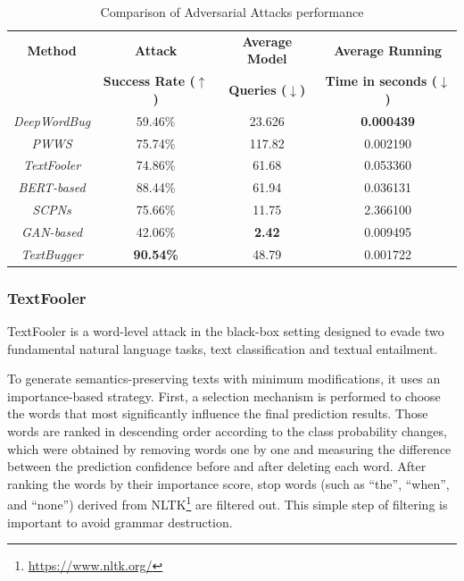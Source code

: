 \begin{table}[h]
  \footnotesize
  \centering
  \begin{tabular}{|c||c|c|c|}
    \hline
    \textbf{Method} & \textbf{Attack}  & \textbf{Average Model}  & \textbf{Average Running} \\
           & \textbf{Success Rate ($\bm{\uparrow}$)} & \textbf{Queries ($\bm{\downarrow}$)} & \textbf{Time in seconds ($\bm{\downarrow}$)} \\
    \hline \hline
    \emph{DeepWordBug} & 59.46\% & 23.626 & \textbf{0.000439} \\
   
    \emph{PWWS} & 75.74\% & 117.82 & 0.002190 \\
   
    \emph{TextFooler} & 74.86\% & 61.68 & 0.053360 \\
   
    \emph{BERT-based} & 88.44\% & 61.94 & 0.036131 \\
   
    \emph{SCPNs} & 75.66\% & 11.75 & 2.366100 \\
   
    \emph{GAN-based} & 42.06\% & \textbf{2.42} & 0.009495 \\
   
    \emph{TextBugger} & \textbf{90.54\%}& 48.79 & 0.001722 \\
    \hline
  \end{tabular}
  \caption{Comparison of Adversarial Attacks performance \cite{QIU2022278}}
\label{tab:2_2_attack-performance}
\end{table}


\subsubsection{TextFooler}\label{subsubsec:textfooler}

TextFooler \cite{journals/corr/abs-1907-11932} is  a word-level attack in the black-box setting designed to evade two fundamental natural language tasks, text classification and textual entailment. 

To generate semantics-preserving texts with minimum modifications, it uses an importance-based strategy. First, a selection mechanism is performed to choose the words that most significantly influence the final prediction results. Those words are ranked in descending order according to the class probability changes, which were obtained by removing words one by one and measuring the difference between the prediction confidence before and after deleting each word.
After ranking the words by their importance score, stop words (such as “the”, “when”, and “none”) derived from NLTK\footnote{\url{https://www.nltk.org/}} are filtered out. This simple step of filtering is important to avoid grammar destruction.

